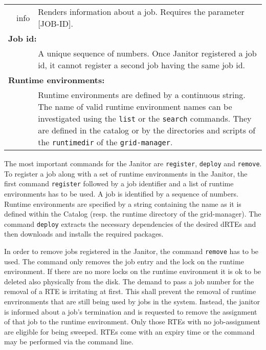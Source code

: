 \begin{table}[!h]
\begin{center}
\begin{tabular}{p{0.5cm}p{2cm}p{11cm}}
	&	info	 & Renders information about a job. Requires the parameter [JOB-ID].\\
	\multicolumn{3}{l}{\textbf{Job id:}}\\
	&		 & A unique sequence of numbers. Once Janitor
			   registered a job id, it cannot register a
			   second job having the same job id.\\
	\multicolumn{3}{l}{\textbf{Runtime environments:}}\\
	&		& Runtime environments are defined by a continuous
			  string.  The name of valid runtime environment
			  names can be investigated using
			  the \texttt{list} or the \texttt{search}
			  commands. They are defined in the
			  catalog or by the directories and
			  scripts of the \texttt{runtimedir}
			  of the \texttt{grid-manager}.\\
	\end{tabular} 
   \end{center}
\end{table}

The most important commands for the Janitor are \texttt{register},
\texttt{deploy} and \texttt{remove}. To register a job along with a set
of runtime environments in the Janitor, the first command \texttt{register}
followed by a job identifier and a list of runtime environments has to be
used.  A job is identified by a sequence of numbers. Runtime environments
are specified by a string containing the name as it is defined within
the Catalog (resp. the runtime directory of the grid-manager).  The command
\texttt{deploy} extracts the necessary dependencies of the desired
dRTEs and then downloads and installs the required packages.


In order to remove jobs registered in the Janitor, the command
\texttt{remove} has to be used.  The command only removes the job
entry and the lock on the runtime environment. If there are no more
locks on the runtime environment it is ok to be deleted also physically
from the disk.  The demand to pass a job number for the removal of a
RTE is irritating at first.  This shall prevent the removal of runtime
envrironments that are still being used by jobs in the system. Instead,
the janitor is informed about a job's termination and is requested to
remove the assignment of that job to the runtime environment. Only those
RTEs with no job-assignment are eligible for being sweeped. RTEs come
with an expiry time or the command may be performed via the command line.

